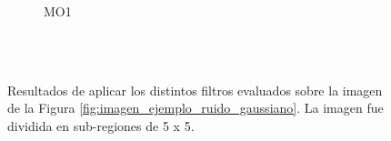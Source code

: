 \begin{figure}
{\begin{subfigure}[b]{0.25\textwidth}
			\caption{MO1}
			\label{fig:mo1}
		\end{subfigure}
	}\\
	\\
	\caption{Resultados de aplicar los distintos filtros evaluados sobre la imagen de la Figura \ref{fig:imagen_ejemplo_ruido_gaussiano}. La imagen fue dividida en sub-regiones de 5 x 5.}	
	\label{fig:imagenes_resultado}
\end{figure}


